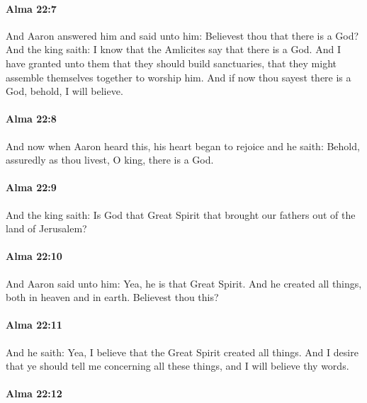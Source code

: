 		\paragraph{Alma 22:7} %
			\label{ALMA-22-7}

			And Aaron answered him and said unto him:
			Believest thou that there is a God?
			And the king saith:
			I know that the Amlicites say that there is a God.
			And I have granted unto them that they should build sanctuaries,
			that they might assemble themselves together to worship him.
			And if now thou sayest there is a God,
			behold, I will believe.

		\paragraph{Alma 22:8} %
			\label{ALMA-22-8}

			And now when Aaron heard this, his heart began to rejoice and he saith:
			Behold, assuredly as thou livest, O king, there is a God.

		\paragraph{Alma 22:9} %
			\label{ALMA-22-9}

			And the king saith:
			Is God that Great Spirit that brought our fathers out of the land of Jerusalem?

		\paragraph{Alma 22:10} %
			\label{ALMA-22-10}

			And Aaron said unto him:
			Yea, he is that Great Spirit.
			And he created all things, both in heaven and in earth.
			Believest thou this?

		\paragraph{Alma 22:11} %
			\label{ALMA-22-11}

			And he saith:
			Yea, I believe that the Great Spirit created all things.
			And I desire that ye should tell me concerning all these things,
			and I will believe thy words.

		\paragraph{Alma 22:12} %
			\label{ALMA-22-12}

